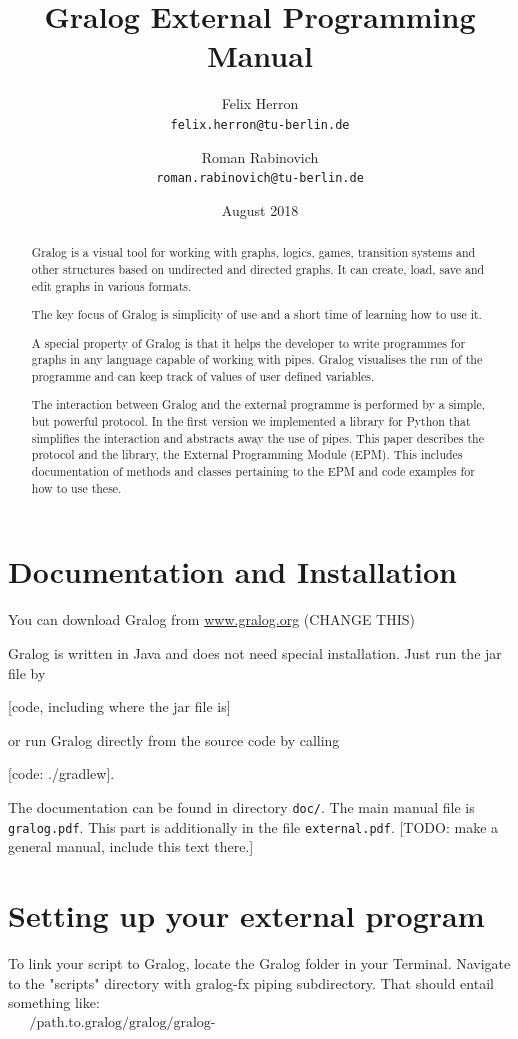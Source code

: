\documentclass{article}
\title{Gralog External Programming Manual}
\author{Felix Herron\\\texttt{felix.herron@tu-berlin.de} \and Roman
  Rabinovich\\ \texttt{roman.rabinovich@tu-berlin.de}}
\date{August 2018}
\begin{document}
\maketitle

\begin{abstract}
  Gralog is a visual tool for working with graphs, logics, games,
  transition systems and other structures based on undirected and
  directed graphs. It can create, load, save and edit graphs in
  various formats.

  The key focus of Gralog is simplicity of use and a short time of
  learning how to use it.

  A special property of Gralog is that it helps the developer to write
  programmes for graphs in any language capable of working with
  pipes. Gralog visualises the run of the programme and can keep track
  of values of user defined variables.

  The interaction between Gralog and the external programme is
  performed by a simple, but powerful protocol. In the first version
  we implemented a library for Python that simplifies the interaction
  and abstracts away the use of pipes. This paper describes the
  protocol and the library, the External Programming Module (EPM). This
  includes documentation of methods and classes pertaining to the
  EPM and code examples for how to use these.
\end{abstract}

\section{Documentation and Installation}

You can download Gralog from \url{www.gralog.org} (CHANGΕ THIS)

Gralog is written in Java and does not need special installation. Just
run the jar file by

[code, including where the jar file is]

or run Gralog directly from the source code by calling

[code: ./gradlew].

The documentation can be found in directory \texttt{doc/}. The main
manual file is \texttt{gralog.pdf}. This part is additionally in the
file \texttt{external.pdf}. [TODO: make a general manual, include this
text there.]

\section{Setting up your external program}
To link your script to Gralog, locate the Gralog folder in your Terminal. Navigate to the "scripts" directory with gralog-fx piping subdirectory. That should entail something like:
\begin{align*}
&\text{~/path.to.gralog/gralog/gralog-fx/src/main/java/gralog/gralogfx/piping/scripts}
\end{align*}
\end{document}
